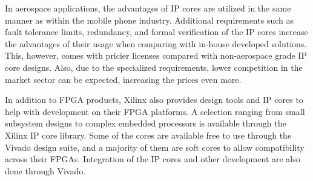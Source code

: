 \documentclass[12pt]{report}
\begin{document}
\par
In aerospace applications, the advantages of IP cores are utilized in the same manner as within the mobile phone industry. Additional requirements such as fault tolerance limits, redundancy, and formal verification of the IP cores increase the advantages of their usage when comparing with in-house developed solutions. This, however, comes with pricier licenses compared with non-aerospace grade IP core designs. Also, due to the specialized requirements, lower competition in the market sector can be expected, increasing the prices even more. \citep{DO254Cadence}
\par
In addition to FPGA products, Xilinx also provides design tools and IP cores to help with development on their FPGA platforms. A selection ranging from small subsystem designs to complex embedded processors is available through the Xilinx IP core library. Some of the cores are available free to use through the Vivado design suite, and a majority of them are soft cores to allow compatibility across their FPGAs. Integration of the IP cores and other development are also done through Vivado. \citep{XilVivado}
\end{document}
